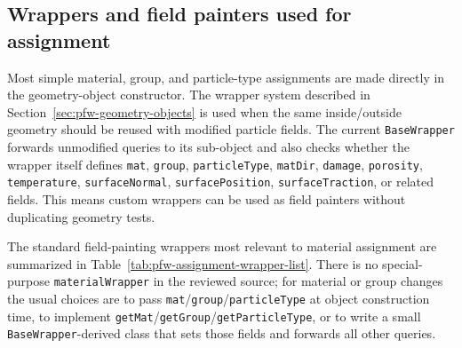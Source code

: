 \subsection{Wrappers and field painters used for assignment}
\label{subsec:pfw-assignment-wrappers}

Most simple material, group, and particle-type assignments are made directly in the geometry-object constructor.  The wrapper system described in Section~\ref{sec:pfw-geometry-objects} is used when the same inside/outside geometry should be reused with modified particle fields.  The current \texttt{BaseWrapper} forwards unmodified queries to its sub-object and also checks whether the wrapper itself defines \texttt{mat}, \texttt{group}, \texttt{particleType}, \texttt{matDir}, \texttt{damage}, \texttt{porosity}, \texttt{temperature}, \texttt{surfaceNormal}, \texttt{surfacePosition}, \texttt{surfaceTraction}, or related fields.  This means custom wrappers can be used as field painters without duplicating geometry tests.

The standard field-painting wrappers most relevant to material assignment are summarized in Table~\ref{tab:pfw-assignment-wrapper-list}.  There is no special-purpose \texttt{materialWrapper} in the reviewed source; for material or group changes the usual choices are to pass \texttt{mat}/\texttt{group}/\texttt{particleType} at object construction time, to implement \texttt{getMat}/\texttt{getGroup}/\texttt{getParticleType}, or to write a small \texttt{BaseWrapper}-derived class that sets those fields and forwards all other queries.

